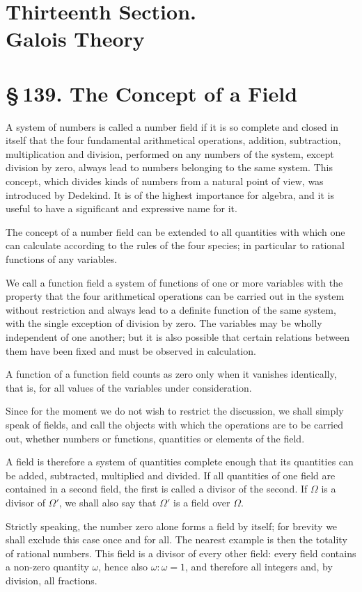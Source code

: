 \documentclass[11pt]{article}
\providecommand{\sect}[2]{\section*{\S\,#1. #2}}
\begin{document}
\section*{Thirteenth Section.\\Galois Theory}

\sect{139}{The Concept of a Field}

A system of numbers is called a number field if it is so complete and closed in itself that the four fundamental arithmetical operations, addition, subtraction, multiplication and division, performed on any numbers of the system, except division by zero, always lead to numbers belonging to the same system. This concept, which divides kinds of numbers from a natural point of view, was introduced by Dedekind. It is of the highest importance for algebra, and it is useful to have a significant and expressive name for it.

The concept of a number field can be extended to all quantities with which one can calculate according to the rules of the four species; in particular to rational functions of any variables.

We call a function field a system of functions of one or more variables with the property that the four arithmetical operations can be carried out in the system without restriction and always lead to a definite function of the same system, with the single exception of division by zero. The variables may be wholly independent of one another; but it is also possible that certain relations between them have been fixed and must be observed in calculation.

A function of a function field counts as zero only when it vanishes identically, that is, for all values of the variables under consideration.

Since for the moment we do not wish to restrict the discussion, we shall simply speak of fields, and call the objects with which the operations are to be carried out, whether numbers or functions, quantities or elements of the field.

A field is therefore a system of quantities complete enough that its quantities can be added, subtracted, multiplied and divided. If all quantities of one field are contained in a second field, the first is called a divisor of the second. If $\Omega$ is a divisor of $\Omega'$, we shall also say that $\Omega'$ is a field over $\Omega$.

Strictly speaking, the number zero alone forms a field by itself; for brevity we shall exclude this case once and for all. The nearest example is then the totality of rational numbers. This field is a divisor of every other field: every field contains a non-zero quantity $\omega$, hence also $\omega:\omega=1$, and therefore all integers and, by division, all fractions.
\end{document}
